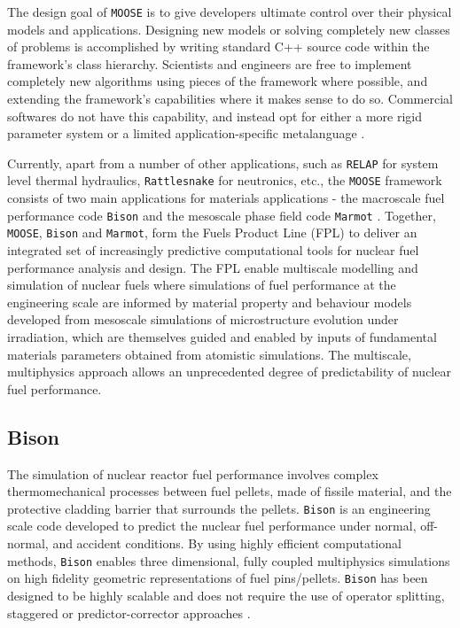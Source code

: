 	The design goal of \texttt{MOOSE} is to give developers ultimate control over their physical models and applications. Designing new models or solving completely new classes of problems is accomplished by writing standard C++ source code within the framework's class hierarchy. Scientists and engineers are free to implement completely new algorithms using pieces of the framework where possible, and extending the framework's capabilities where it makes sense to do so. Commercial softwares do not have this capability, and instead opt for either a more rigid parameter system or a limited application-specific metalanguage \cite{moose-web-page}.

	Currently, apart from a number of other applications, such as \texttt{RELAP} \cite{Zhang:aa} for system level thermal hydraulics, \texttt{Rattlesnake} \cite{Wang:aa} for neutronics, etc., the \texttt{MOOSE} framework consists of two main applications for materials applications - the macroscale fuel performance code \texttt{Bison} \cite{Newman09} and the mesoscale phase field code \texttt{Marmot}  \cite{Tonks12}. Together, \texttt{MOOSE}, \texttt{Bison}  and \texttt{Marmot}, form the Fuels Product Line (FPL) to deliver an integrated set of increasingly predictive computational tools for nuclear fuel performance analysis and design. The FPL enable multiscale modelling and simulation of nuclear fuels where simulations of fuel performance at the engineering scale are informed by material property and behaviour models developed from mesoscale simulations of microstructure evolution under irradiation, which are themselves guided and enabled by inputs of fundamental materials parameters obtained from atomistic simulations. The multiscale, multiphysics approach allows an unprecedented degree of predictability of nuclear fuel performance.

	\subsection{Bison}
	The simulation of nuclear reactor fuel performance involves complex thermomechanical processes between fuel pellets, made of fissile material, and the protective cladding barrier that surrounds the pellets. \texttt{Bison} is an engineering scale code developed to predict the nuclear fuel performance under normal, off-normal, and accident conditions. By using highly efficient computational methods, \texttt{Bison} enables three dimensional, fully coupled multiphysics simulations on high fidelity geometric representations of fuel pins/pellets. \texttt{Bison} has been designed to be highly scalable and does not require the use of operator splitting, staggered or predictor-corrector approaches \cite{WILLIAMSON2012149}.

